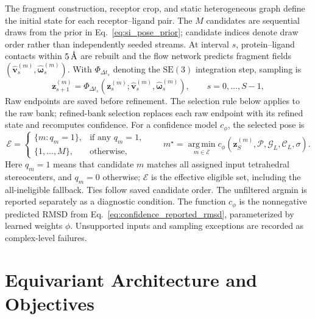 \documentclass{article}
\renewcommand{\boldsymbol}[1]{\pmb{#1}}
\newcommand{\angstrom}{\text{\normalfont\AA}}
\newcommand{\SE}{\mathrm{SE}}
\begin{document}
The fragment construction, receptor crop, and static heterogeneous graph define the initial state for each receptor--ligand pair.
The \(M\) candidates are sequential draws from the prior in Eq.~\eqref{eq:si_pose_prior}; candidate indices denote draw order rather than independently seeded streams.
At interval \(s\), protein--ligand contacts within \(5\,\angstrom\) are rebuilt and the flow network predicts fragment fields \((\widehat{\mathbf v}_{s}^{(m)},\widehat{\boldsymbol\omega}_{s}^{(m)})\).
With \(\Phi_{\Delta t_s}\) denoting the \(\SE(3)\) integration step, sampling is
\begin{equation}
    \mathbf z_{s+1}^{(m)}=
    \Phi_{\Delta t_s}\!\left(
      \mathbf z_s^{(m)};
      \widehat{\mathbf v}_{s}^{(m)},
      \widehat{\boldsymbol\omega}_{s}^{(m)}
    \right),
    \qquad s=0,\ldots,S-1,
    \label{eq:si_sampling_update}
\end{equation}
Raw endpoints are saved before refinement. The selection rule below applies to the raw bank; refined-bank selection replaces each raw endpoint with its refined state and recomputes confidence. For a confidence model \(c_\phi\), the selected pose is
\begin{equation}
    \mathcal E=\begin{cases}
       \{m:q_m=1\}, & \text{if any }q_m=1,\\
       \{1,\ldots,M\}, & \text{otherwise},
    \end{cases}
    \qquad
    m^\star=\operatorname*{arg\,min}_{m\in\mathcal E}
    c_\phi\!\left(\mathbf z_S^{(m)},\mathcal P,\mathcal G_L,\mathcal C_L,\sigma\right).
    \label{eq:si_confidence_selection}
\end{equation}
Here \(q_m=1\) means that candidate \(m\) matches all assigned input tetrahedral stereocenters, and \(q_m=0\) otherwise; \(\mathcal E\) is the effective eligible set, including the all-ineligible fallback. Ties follow saved candidate order. The unfiltered argmin is reported separately as a diagnostic condition.
The function \(c_\phi\) is the nonnegative predicted RMSD from Eq.~\eqref{eq:confidence_reported_rmsd}, parameterized by learned weights \(\phi\).
Unsupported inputs and sampling exceptions are recorded as complex-level failures.

\section{Equivariant Architecture and Objectives}
\label{app:architecture_details}
\end{document}
